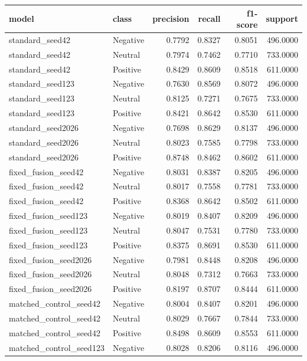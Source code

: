 \begin{tabular}{llrrrr}
\toprule
model & class & precision & recall & f1-score & support \\
\midrule
standard\_seed42 & Negative & 0.7792 & 0.8327 & 0.8051 & 496.0000 \\
standard\_seed42 & Neutral & 0.7974 & 0.7462 & 0.7710 & 733.0000 \\
standard\_seed42 & Positive & 0.8429 & 0.8609 & 0.8518 & 611.0000 \\
standard\_seed123 & Negative & 0.7630 & 0.8569 & 0.8072 & 496.0000 \\
standard\_seed123 & Neutral & 0.8125 & 0.7271 & 0.7675 & 733.0000 \\
standard\_seed123 & Positive & 0.8421 & 0.8642 & 0.8530 & 611.0000 \\
standard\_seed2026 & Negative & 0.7698 & 0.8629 & 0.8137 & 496.0000 \\
standard\_seed2026 & Neutral & 0.8023 & 0.7585 & 0.7798 & 733.0000 \\
standard\_seed2026 & Positive & 0.8748 & 0.8462 & 0.8602 & 611.0000 \\
fixed\_fusion\_seed42 & Negative & 0.8031 & 0.8387 & 0.8205 & 496.0000 \\
fixed\_fusion\_seed42 & Neutral & 0.8017 & 0.7558 & 0.7781 & 733.0000 \\
fixed\_fusion\_seed42 & Positive & 0.8368 & 0.8642 & 0.8502 & 611.0000 \\
fixed\_fusion\_seed123 & Negative & 0.8019 & 0.8407 & 0.8209 & 496.0000 \\
fixed\_fusion\_seed123 & Neutral & 0.8047 & 0.7531 & 0.7780 & 733.0000 \\
fixed\_fusion\_seed123 & Positive & 0.8375 & 0.8691 & 0.8530 & 611.0000 \\
fixed\_fusion\_seed2026 & Negative & 0.7981 & 0.8448 & 0.8208 & 496.0000 \\
fixed\_fusion\_seed2026 & Neutral & 0.8048 & 0.7312 & 0.7663 & 733.0000 \\
fixed\_fusion\_seed2026 & Positive & 0.8197 & 0.8707 & 0.8444 & 611.0000 \\
matched\_control\_seed42 & Negative & 0.8004 & 0.8407 & 0.8201 & 496.0000 \\
matched\_control\_seed42 & Neutral & 0.8029 & 0.7667 & 0.7844 & 733.0000 \\
matched\_control\_seed42 & Positive & 0.8498 & 0.8609 & 0.8553 & 611.0000 \\
matched\_control\_seed123 & Negative & 0.8028 & 0.8206 & 0.8116 & 496.0000 \\

\end{tabular}
